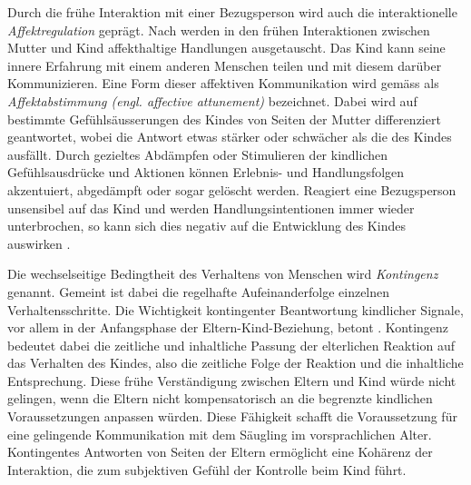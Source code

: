 Durch die frühe Interaktion mit einer Bezugsperson wird auch die interaktionelle \textit{Affektregulation} geprägt. Nach  werden in den frühen Interaktionen zwischen Mutter und Kind affekthaltige Handlungen ausgetauscht. Das Kind kann seine innere Erfahrung mit einem anderen Menschen teilen und mit diesem darüber Kommunizieren. Eine Form dieser affektiven Kommunikation wird gemäss  als \textit{Affektabstimmung (engl. affective attunement)} bezeichnet. Dabei wird auf bestimmte Gefühlsäusserungen des Kindes von Seiten der Mutter differenziert geantwortet, wobei die Antwort etwas stärker oder schwächer als die des Kindes ausfällt. Durch gezieltes Abdämpfen oder Stimulieren der kindlichen Gefühlsausdrücke und Aktionen können Erlebnis- und Handlungsfolgen akzentuiert, abgedämpft oder sogar gelöscht werden. Reagiert eine Bezugsperson unsensibel auf das Kind und werden Handlungsintentionen immer wieder unterbrochen, so kann sich dies negativ auf die Entwicklung des Kindes auswirken \cite{Resch1999}.

Die wechselseitige Bedingtheit des Verhaltens von Menschen wird \textit{Kontingenz} genannt. Gemeint ist dabei die regelhafte Aufeinanderfolge einzelnen Verhaltensschritte. Die Wichtigkeit kontingenter Beantwortung kindlicher Signale, vor allem in der Anfangsphase der Eltern-Kind-Beziehung, betont . Kontingenz bedeutet dabei die zeitliche und inhaltliche Passung der elterlichen Reaktion auf das Verhalten des Kindes, also die zeitliche Folge der Reaktion und die inhaltliche Entsprechung. Diese frühe Verständigung zwischen Eltern und Kind würde nicht gelingen, wenn die Eltern nicht kompensatorisch an die begrenzte kindlichen Voraussetzungen anpassen würden. Diese Fähigkeit schafft die Voraussetzung für eine gelingende Kommunikation mit dem Säugling im vorsprachlichen Alter. Kontingentes Antworten von Seiten der Eltern ermöglicht eine Kohärenz der Interaktion, die zum subjektiven Gefühl der Kontrolle beim Kind führt.


